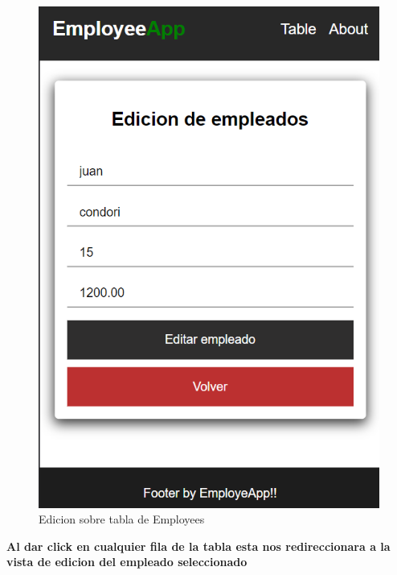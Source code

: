 \documentclass{article}
\begin{document}
        \begin{figure}[ht]
            \centering
            \includegraphics[scale=0.4]{img/img9.png}
            \caption{Edicion sobre tabla de Employees}
            \label{fig:enter-label}
        \end{figure}
        \textbf{Al dar click en cualquier fila de la tabla esta nos redireccionara a la vista de edicion del empleado seleccionado}
        
\end{document}
